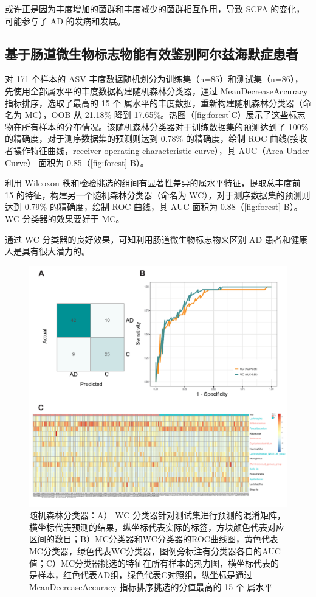 \documentclass[supercite]{HustGraduPaper}
\begin{document}
或许正是因为丰度增加的菌群和丰度减少的菌群相互作用，导致 SCFA 的变化，可能参与了 AD 的发病和发展。



\subsection{基于肠道微生物标志物能有效鉴别阿尔兹海默症患者}
对 171 个样本的 ASV 丰度数据随机划分为训练集（n=85）和测试集（n=86），先使用全部属水平的丰度数据构建随机森林分类器，通过 MeanDecreaseAccuracy 指标排序，选取了最高的 15 个 属水平的丰度数据，重新构建随机森林分类器（命名为 MC），OOB 从 21.18\% 降到 17.65\%。热图（\autoref{fig:forest}C）展示了这些标志物在所有样本的分布情况。该随机森林分类器对于训练数据集的预测达到了 100\% 的精确度，对于测序数据集的预测则达到 0.78\% 的精确度，绘制 ROC 曲线(接收者操作特征曲线，receiver operating characteristic curve），其 AUC（Area Under Curve） 面积为 0.85（\autoref{fig:forest} B）。

利用 Wilcoxon 秩和检验挑选的组间有显著性差异的属水平特征，提取总丰度前 15 的特征，构建另一个随机森林分类器（命名为 WC），对于测序数据集的预测则达到 0.79\% 的精确度，绘制 ROC 曲线，其 AUC 面积为 0.88（\autoref{fig:forest} B）。WC 分类器的效果要好于 MC。

通过 WC 分类器的良好效果，可知利用肠道微生物标志物来区别 AD 患者和健康人是具有很大潜力的。
\begin{figure}[htb]
	\includegraphics[width=\textwidth]{plot/RandomForest.pdf}
	\caption{随机森林分类器：A） WC 分类器针对测试集进行预测的混淆矩阵，横坐标代表预测的结果，纵坐标代表实际的标签，方块颜色代表对应区间的数目；B）MC分类器和WC分类器的ROC曲线图，黄色代表MC分类器，绿色代表WC分类器，图例旁标注有分类器各自的AUC值；C）MC分类器挑选的特征在所有样本的热力图，横坐标代表的是样本，红色代表AD组，绿色代表C对照组，纵坐标是通过 MeanDecreaseAccuracy 指标排序挑选的分值最高的 15 个 属水平}
	\label{fig:forest}
\end{figure}
\end{document}

